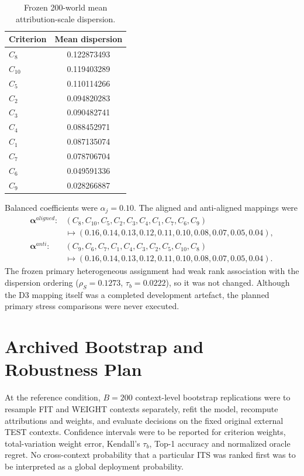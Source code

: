 \documentclass[runningheads]{llncs}
\begin{document}
\begin{table}[t]
\centering
\caption{Frozen 200-world mean attribution-scale dispersion.}
\label{supp:tab:d3dispersion}
\small
\begin{tabular}{@{}lc@{}}
\toprule
Criterion & Mean dispersion\\
\midrule
$C_8$ & 0.122873493\\
$C_{10}$ & 0.119403289\\
$C_5$ & 0.110114266\\
$C_2$ & 0.094820283\\
$C_3$ & 0.090482741\\
$C_4$ & 0.088452971\\
$C_1$ & 0.087135074\\
$C_7$ & 0.078706704\\
$C_6$ & 0.049591336\\
$C_9$ & 0.028266887\\
\bottomrule
\end{tabular}
\end{table}

Balanced coefficients were $\alpha_j=0.10$. The aligned and anti-aligned mappings were
\begin{align}
\boldsymbol\alpha^{aligned}:
&(C_8,C_{10},C_5,C_2,C_3,C_4,C_1,C_7,C_6,C_9)
\nonumber\\
&\mapsto(0.16,0.14,0.13,0.12,0.11,0.10,0.08,0.07,0.05,0.04),
\label{supp:eq:alphaaligned}\\
\boldsymbol\alpha^{anti}:
&(C_9,C_6,C_7,C_1,C_4,C_3,C_2,C_5,C_{10},C_8)
\nonumber\\
&\mapsto(0.16,0.14,0.13,0.12,0.11,0.10,0.08,0.07,0.05,0.04).
\label{supp:eq:alphaanti}
\end{align}
The frozen primary heterogeneous assignment had weak rank association with the dispersion
ordering ($\rho_S=0.1273$, $\tau_b=0.0222$), so it was not changed. Although the D3 mapping
itself was a completed development artefact, the planned primary stress comparisons were never
executed.

\section{Archived Bootstrap and Robustness Plan}

At the reference condition, $B=200$ context-level bootstrap replications were to resample FIT
and WEIGHT contexts separately, refit the model, recompute attributions and weights, and
evaluate decisions on the fixed original external TEST contexts. Confidence intervals were to
be reported for criterion weights, total-variation weight error, Kendall's $\tau_b$, Top-1
accuracy and normalized oracle regret. No cross-context probability that a particular ITS was
ranked first was to be interpreted as a global deployment probability.
\end{document}
